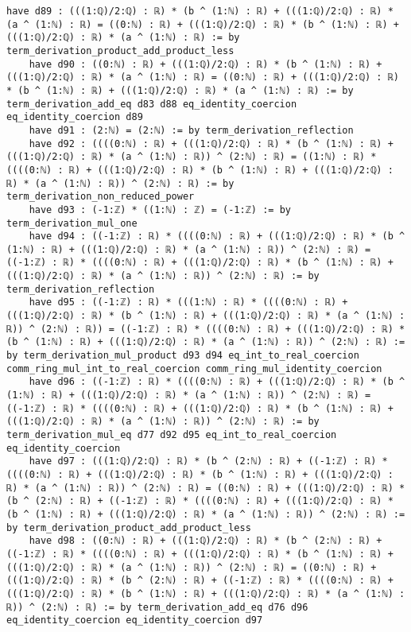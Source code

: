 \documentclass{article}
\begin{document}
\begin{tcolorbox}[colback=white!10, width=\linewidth]
\begin{lstlisting}[language=Lean4]
    have d89 : (((1:ℚ)/2:ℚ) : ℝ) * (b ^ (1:ℕ) : ℝ) + (((1:ℚ)/2:ℚ) : ℝ) * (a ^ (1:ℕ) : ℝ) = ((0:ℕ) : ℝ) + (((1:ℚ)/2:ℚ) : ℝ) * (b ^ (1:ℕ) : ℝ) + (((1:ℚ)/2:ℚ) : ℝ) * (a ^ (1:ℕ) : ℝ) := by term_derivation_product_add_product_less
    have d90 : ((0:ℕ) : ℝ) + (((1:ℚ)/2:ℚ) : ℝ) * (b ^ (1:ℕ) : ℝ) + (((1:ℚ)/2:ℚ) : ℝ) * (a ^ (1:ℕ) : ℝ) = ((0:ℕ) : ℝ) + (((1:ℚ)/2:ℚ) : ℝ) * (b ^ (1:ℕ) : ℝ) + (((1:ℚ)/2:ℚ) : ℝ) * (a ^ (1:ℕ) : ℝ) := by term_derivation_add_eq d83 d88 eq_identity_coercion eq_identity_coercion d89
    have d91 : (2:ℕ) = (2:ℕ) := by term_derivation_reflection
    have d92 : ((((0:ℕ) : ℝ) + (((1:ℚ)/2:ℚ) : ℝ) * (b ^ (1:ℕ) : ℝ) + (((1:ℚ)/2:ℚ) : ℝ) * (a ^ (1:ℕ) : ℝ)) ^ (2:ℕ) : ℝ) = ((1:ℕ) : ℝ) * ((((0:ℕ) : ℝ) + (((1:ℚ)/2:ℚ) : ℝ) * (b ^ (1:ℕ) : ℝ) + (((1:ℚ)/2:ℚ) : ℝ) * (a ^ (1:ℕ) : ℝ)) ^ (2:ℕ) : ℝ) := by term_derivation_non_reduced_power
    have d93 : (-1:ℤ) * ((1:ℕ) : ℤ) = (-1:ℤ) := by term_derivation_mul_one
    have d94 : ((-1:ℤ) : ℝ) * ((((0:ℕ) : ℝ) + (((1:ℚ)/2:ℚ) : ℝ) * (b ^ (1:ℕ) : ℝ) + (((1:ℚ)/2:ℚ) : ℝ) * (a ^ (1:ℕ) : ℝ)) ^ (2:ℕ) : ℝ) = ((-1:ℤ) : ℝ) * ((((0:ℕ) : ℝ) + (((1:ℚ)/2:ℚ) : ℝ) * (b ^ (1:ℕ) : ℝ) + (((1:ℚ)/2:ℚ) : ℝ) * (a ^ (1:ℕ) : ℝ)) ^ (2:ℕ) : ℝ) := by term_derivation_reflection
    have d95 : ((-1:ℤ) : ℝ) * (((1:ℕ) : ℝ) * ((((0:ℕ) : ℝ) + (((1:ℚ)/2:ℚ) : ℝ) * (b ^ (1:ℕ) : ℝ) + (((1:ℚ)/2:ℚ) : ℝ) * (a ^ (1:ℕ) : ℝ)) ^ (2:ℕ) : ℝ)) = ((-1:ℤ) : ℝ) * ((((0:ℕ) : ℝ) + (((1:ℚ)/2:ℚ) : ℝ) * (b ^ (1:ℕ) : ℝ) + (((1:ℚ)/2:ℚ) : ℝ) * (a ^ (1:ℕ) : ℝ)) ^ (2:ℕ) : ℝ) := by term_derivation_mul_product d93 d94 eq_int_to_real_coercion comm_ring_mul_int_to_real_coercion comm_ring_mul_identity_coercion
    have d96 : ((-1:ℤ) : ℝ) * ((((0:ℕ) : ℝ) + (((1:ℚ)/2:ℚ) : ℝ) * (b ^ (1:ℕ) : ℝ) + (((1:ℚ)/2:ℚ) : ℝ) * (a ^ (1:ℕ) : ℝ)) ^ (2:ℕ) : ℝ) = ((-1:ℤ) : ℝ) * ((((0:ℕ) : ℝ) + (((1:ℚ)/2:ℚ) : ℝ) * (b ^ (1:ℕ) : ℝ) + (((1:ℚ)/2:ℚ) : ℝ) * (a ^ (1:ℕ) : ℝ)) ^ (2:ℕ) : ℝ) := by term_derivation_mul_eq d77 d92 d95 eq_int_to_real_coercion eq_identity_coercion
    have d97 : (((1:ℚ)/2:ℚ) : ℝ) * (b ^ (2:ℕ) : ℝ) + ((-1:ℤ) : ℝ) * ((((0:ℕ) : ℝ) + (((1:ℚ)/2:ℚ) : ℝ) * (b ^ (1:ℕ) : ℝ) + (((1:ℚ)/2:ℚ) : ℝ) * (a ^ (1:ℕ) : ℝ)) ^ (2:ℕ) : ℝ) = ((0:ℕ) : ℝ) + (((1:ℚ)/2:ℚ) : ℝ) * (b ^ (2:ℕ) : ℝ) + ((-1:ℤ) : ℝ) * ((((0:ℕ) : ℝ) + (((1:ℚ)/2:ℚ) : ℝ) * (b ^ (1:ℕ) : ℝ) + (((1:ℚ)/2:ℚ) : ℝ) * (a ^ (1:ℕ) : ℝ)) ^ (2:ℕ) : ℝ) := by term_derivation_product_add_product_less
    have d98 : ((0:ℕ) : ℝ) + (((1:ℚ)/2:ℚ) : ℝ) * (b ^ (2:ℕ) : ℝ) + ((-1:ℤ) : ℝ) * ((((0:ℕ) : ℝ) + (((1:ℚ)/2:ℚ) : ℝ) * (b ^ (1:ℕ) : ℝ) + (((1:ℚ)/2:ℚ) : ℝ) * (a ^ (1:ℕ) : ℝ)) ^ (2:ℕ) : ℝ) = ((0:ℕ) : ℝ) + (((1:ℚ)/2:ℚ) : ℝ) * (b ^ (2:ℕ) : ℝ) + ((-1:ℤ) : ℝ) * ((((0:ℕ) : ℝ) + (((1:ℚ)/2:ℚ) : ℝ) * (b ^ (1:ℕ) : ℝ) + (((1:ℚ)/2:ℚ) : ℝ) * (a ^ (1:ℕ) : ℝ)) ^ (2:ℕ) : ℝ) := by term_derivation_add_eq d76 d96 eq_identity_coercion eq_identity_coercion d97

\end{lstlisting}
\end{tcolorbox}
\end{document}
